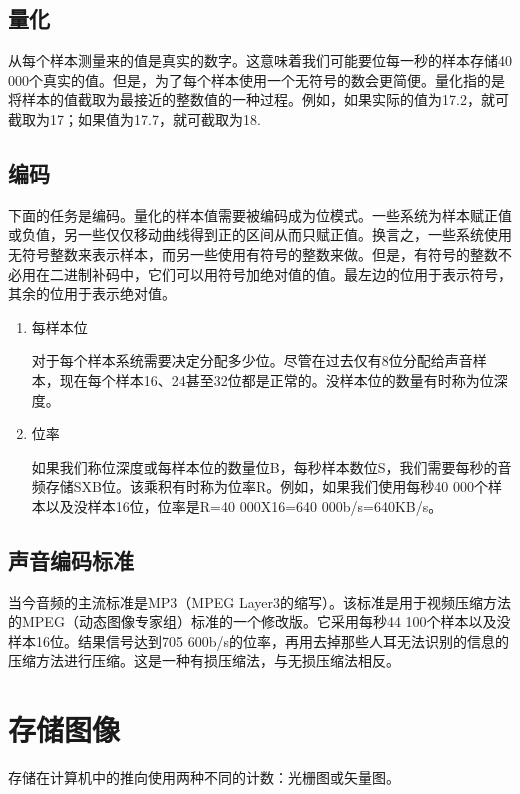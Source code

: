 \subsection{量化}
从每个样本测量来的值是真实的数字。这意味着我们可能要位每一秒的样本存储40 000个真实的值。但是，为了每个样本使用一个无符号的数会更简便。量化指的是将样本的值截取为最接近的整数值的一种过程。例如，如果实际的值为17.2，就可截取为17；如果值为17.7，就可截取为18.
\subsection{编码}
下面的任务是编码。量化的样本值需要被编码成为位模式。一些系统为样本赋正值或负值，另一些仅仅移动曲线得到正的区间从而只赋正值。换言之，一些系统使用无符号整数来表示样本，而另一些使用有符号的整数来做。但是，有符号的整数不必用在二进制补码中，它们可以用符号加绝对值的值。最左边的位用于表示符号，其余的位用于表示绝对值。
\begin{enumerate}
	\item 每样本位

	对于每个样本系统需要决定分配多少位。尽管在过去仅有8位分配给声音样本，现在每个样本16、24甚至32位都是正常的。没样本位的数量有时称为位深度。
	\item 位率

	如果我们称位深度或每样本位的数量位B，每秒样本数位S，我们需要每秒的音频存储SXB位。该乘积有时称为位率R。例如，如果我们使用每秒40 000个样本以及没样本16位，位率是R=40 000X16=640 000b/s=640KB/s。
\end{enumerate}
\subsection{声音编码标准}
当今音频的主流标准是MP3（MPEG Layer3的缩写）。该标准是用于视频压缩方法的MPEG（动态图像专家组）标准的一个修改版。它采用每秒44 100个样本以及没样本16位。结果信号达到705 600b/s的位率，再用去掉那些人耳无法识别的信息的压缩方法进行压缩。这是一种有损压缩法，与无损压缩法相反。
\section{存储图像}
存储在计算机中的推向使用两种不同的计数：光栅图或矢量图。

